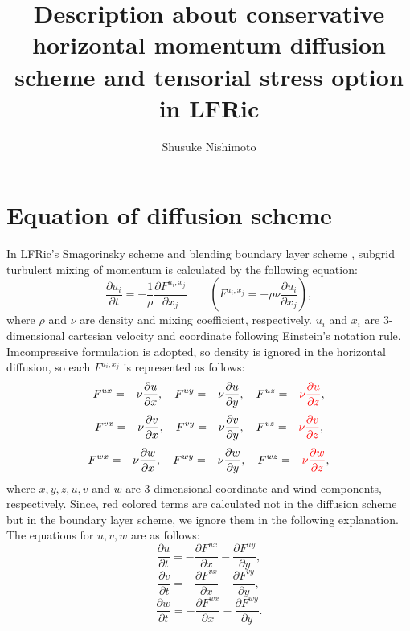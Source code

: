 \documentclass[9pt]{jsarticle}
\title{Description about conservative horizontal momentum diffusion scheme and tensorial stress option in LFRic}
\author{Shusuke Nishimoto}
\date{\hfill}
\begin{document}
\maketitle

\section{Equation of diffusion scheme}

In LFRic's Smagorinsky scheme and blending boundary layer scheme \cite{boutle14}, subgrid turbulent mixing of momentum is calculated by the following equation:
\begin{equation}
  \frac{\partial u_i}{\partial t} = -\frac{1}{\rho} \frac{\partial F^{u_i, x_j} }{\partial x_j} \quad\quad \left( F^{u_i, x_j} = -\rho\nu \frac{\partial u_i}{\partial x_j} \right),
  \label{eq:base}
\end{equation}
where $\rho$ and $\nu$ are density and mixing coefficient, respectively. $u_i$ and $x_i$ are 3-dimensional cartesian velocity and coordinate following Einstein's notation rule.
Imcompressive formulation is adopted, so density is ignored in the horizontal diffusion, so each $F^{u_i, x_j}$ is represented as follows:
\begin{equation*}
  F^{ux} = -\nu \frac{\partial u}{\partial x}, \quad
  F^{uy} = -\nu \frac{\partial u}{\partial y}, \quad
  F^{uz} = \textcolor{red}{-\nu \frac{\partial u}{\partial z}},
\end{equation*}
\begin{equation*}
  F^{vx} = -\nu \frac{\partial v}{\partial x}, \quad
  F^{vy} = -\nu \frac{\partial v}{\partial y}, \quad
  F^{vz} = \textcolor{red}{-\nu \frac{\partial v}{\partial z}},
\end{equation*}
\begin{equation*}
  F^{wx} = -\nu \frac{\partial w}{\partial x}, \quad
  F^{wy} = -\nu \frac{\partial w}{\partial y}, \quad
  F^{wz} = \textcolor{red}{-\nu \frac{\partial w}{\partial z}},
\end{equation*}
where $x, y, z, u, v$ and $w$ are 3-dimensional coordinate and wind components, respectively.
Since, red colored terms are calculated not in the diffusion scheme but in the boundary layer scheme, we ignore them in the following explanation.
The equations for $u, v, w$ are as follows:
\begin{equation}
  \frac{\partial u}{\partial t} = -\frac{\partial F^{ux}}{\partial x} - \frac{\partial F^{uy}}{\partial y},
  \label{eq:baseu}
\end{equation}
\begin{equation}
  \frac{\partial v}{\partial t} = -\frac{\partial F^{vx}}{\partial x} - \frac{\partial F^{vy}}{\partial y},
  \label{eq:basev}
\end{equation}
\begin{equation}
  \frac{\partial w}{\partial t} = -\frac{\partial F^{wx}}{\partial x} - \frac{\partial F^{wy}}{\partial y}.
  \label{eq:basew}
\end{equation}
\end{document}
